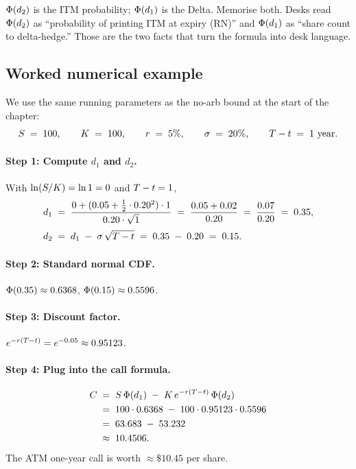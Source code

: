 \begin{intuitionbox}
$\Phi(d_2)$ is the ITM probability; $\Phi(d_1)$ is the Delta.
Memorise both. Desks read $\Phi(d_2)$ as ``probability of
printing ITM at expiry (RN)'' and $\Phi(d_1)$ as ``share count
to delta-hedge.'' Those are the two facts that turn the formula
into desk language.
\end{intuitionbox}

\subsection{Worked numerical example}
\label{subsec:ch15_numerical}

We use the same running parameters as the no-arb bound at the
start of the chapter:
\begin{equation*}
  S \;=\; 100, \qquad K \;=\; 100,
  \qquad r \;=\; 5\%, \qquad \sigma \;=\; 20\%,
  \qquad T - t \;=\; 1 \text{ year.}
\end{equation*}

\paragraph{Step 1: Compute $d_1$ and $d_2$.}
With $\ln(S/K) = \ln 1 = 0$ and $T - t = 1$,
\begin{align}
  d_1 \;&=\; \frac{0 + (0.05 + \tfrac{1}{2}\cdot 0.20^2)\cdot 1}
                  {0.20 \cdot \sqrt{1}}
       \;=\; \frac{0.05 + 0.02}{0.20}
       \;=\; \frac{0.07}{0.20}
       \;=\; 0.35,
  \label{eq:numex_d1} \\[0.25em]
  d_2 \;&=\; d_1 \;-\; \sigma\,\sqrt{T - t}
       \;=\; 0.35 \;-\; 0.20
       \;=\; 0.15.
  \label{eq:numex_d2}
\end{align}

\paragraph{Step 2: Standard normal CDF.}
$\Phi(0.35) \approx 0.6368$, $\Phi(0.15) \approx 0.5596$.

\paragraph{Step 3: Discount factor.}
$e^{-r(T - t)} = e^{-0.05} \approx 0.95123$.

\paragraph{Step 4: Plug into the call formula.}
\begin{align}
  C \;&=\; S\,\Phi(d_1)
            \;-\; K\,e^{-r(T - t)}\,\Phi(d_2)
  \nonumber \\
  \;&=\; 100 \cdot 0.6368
       \;-\; 100 \cdot 0.95123 \cdot 0.5596 \nonumber \\
  \;&=\; 63.683 \;-\; 53.232 \nonumber \\
  \;&\approx\; 10.4506.
  \label{eq:numex_call}
\end{align}
The ATM one-year call is worth $\approx \$10.45$ per share.


